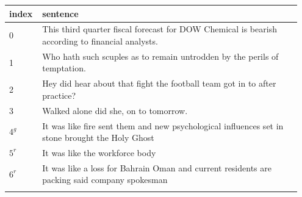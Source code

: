 \documentclass[11pt,a4paper]{article}
\begin{document}
\vspace{4mm}
\begin{tabular}{p{0.1\linewidth}|p{0.85\linewidth}}
\hline
   index & sentence                                                                                        \\
\hline
       0 & This third quarter fiscal forecast for DOW Chemical is bearish according to financial analysts. \\
       1 & Who hath such scuples as to remain untrodden by the perils of temptation.                       \\
       2 & Hey did hear about that fight the football team got in to after practice?                       \\
       3 & Walked alone did she, on to tomorrow.                                                           \\
       $4^g$ & It was like fire sent them and new psychological influences set in stone brought the Holy Ghost \\
       $5^r$ & It was like the workforce body                                                                  \\
       $6^r$ & It was like a loss for Bahrain Oman and current residents are packing said company spokesman    \\
\hline
\label{table:sentence_reference}
\end{tabular}
\end{document}
